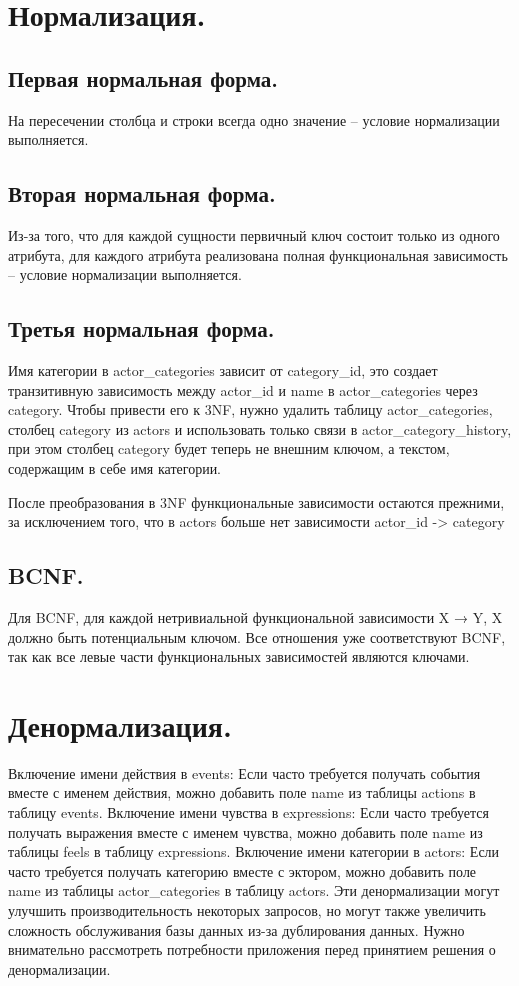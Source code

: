 \section{Нормализация.}
\subsection{Первая нормальная форма.}
На пересечении столбца и строки всегда одно значение – условие нормализации выполняется.
\subsection{Вторая нормальная форма.}
Из-за того, что для каждой сущности первичный ключ состоит только из одного атрибута, для каждого атрибута реализована
полная функциональная зависимость – условие нормализации выполняется.
\subsection{Третья нормальная форма.}
Имя категории в actor\_categories зависит от category\_id, это создает транзитивную зависимость между actor\_id и name
в actor\_categories через category. Чтобы привести его к 3NF, нужно удалить таблицу actor\_categories, столбец category из actors и использовать
только связи в actor\_category\_history, при этом столбец category будет теперь не внешним ключом, а текстом, содержащим в себе имя категории.

После преобразования в 3NF функциональные зависимости остаются прежними, за исключением того, что в actors больше нет зависимости
actor\_id -> category

\subsection{BCNF.}
Для BCNF, для каждой нетривиальной функциональной зависимости X → Y, X должно быть потенциальным ключом. Все отношения
уже соответствуют BCNF, так как все левые части функциональных зависимостей являются ключами.

\section{Денормализация.}
Включение имени действия в events: Если часто требуется получать события вместе с именем действия, можно добавить поле name из таблицы actions в таблицу events.
Включение имени чувства в expressions: Если часто требуется получать выражения вместе с именем чувства, можно добавить поле name из таблицы feels в таблицу expressions.
Включение имени категории в actors: Если часто требуется получать категорию вместе с эктором, можно добавить поле name из таблицы actor\_categories в таблицу actors.
Эти денормализации могут улучшить производительность некоторых запросов, но могут также увеличить сложность обслуживания базы данных из-за дублирования данных.
Нужно внимательно рассмотреть потребности приложения перед принятием решения о денормализации.


